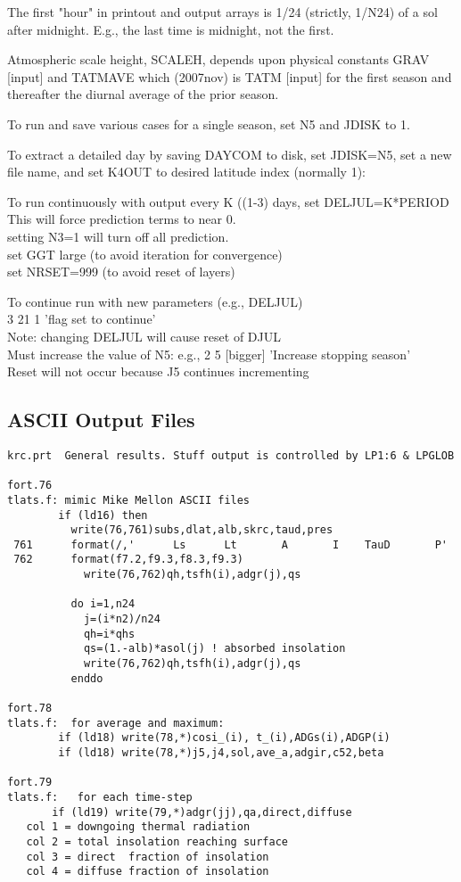 \documentclass[draft]{article}  %
\newcommand{\qi}{\\ \hspace*{2.em}}      %
\begin{document}
The first "hour" in printout and output arrays is 1/24 (strictly, 1/N24) of a
sol after midnight. E.g., the last time is midnight, not the first.

Atmospheric scale height, SCALEH, depends upon physical constants GRAV [input] 
and TATMAVE which (2007nov) is TATM [input] for the first season and 
thereafter the diurnal average of the prior season. 
 
To run and save various cases for a single season, set N5 and JDISK to 1.

To extract a detailed day by saving DAYCOM to disk, set JDISK=N5, set a new
file name, and set K4OUT to desired latitude index (normally 1):

To run continuously with output every K ((1-3) days, set DELJUL=K*PERIOD
This will force prediction terms to near 0.
\qi        setting N3=1 will turn off all prediction.
\qi        set GGT large (to avoid iteration for convergence)
\qi        set NRSET=999 (to avoid reset of layers)

To continue run with new parameters (e.g., DELJUL)
\qi	3 21 1 'flag set to continue' \\
Note: changing DELJUL will cause reset of DJUL \\
Must increase the value of N5: e.g., 2 5 [bigger] 'Increase stopping season' 
\qi Reset will not occur because J5 continues incrementing


\subsection{ASCII Output Files} %
\vspace{-3.mm}
\begin{verbatim}
krc.prt  General results. Stuff output is controlled by LP1:6 & LPGLOB

fort.76
tlats.f: mimic Mike Mellon ASCII files
        if (ld16) then
          write(76,761)subs,dlat,alb,skrc,taud,pres
 761      format(/,'      Ls      Lt       A       I    TauD       P'
 762      format(f7.2,f9.3,f8.3,f9.3)
            write(76,762)qh,tsfh(i),adgr(j),qs

          do i=1,n24
            j=(i*n2)/n24
            qh=i*qhs
            qs=(1.-alb)*asol(j) ! absorbed insolation
            write(76,762)qh,tsfh(i),adgr(j),qs
          enddo

fort.78
tlats.f:  for average and maximum:
        if (ld18) write(78,*)cosi_(i), t_(i),ADGs(i),ADGP(i)
        if (ld18) write(78,*)j5,j4,sol,ave_a,adgir,c52,beta

fort.79
tlats.f:   for each time-step
       if (ld19) write(79,*)adgr(jj),qa,direct,diffuse
   col 1 = downgoing thermal radiation
   col 2 = total insolation reaching surface
   col 3 = direct  fraction of insolation
   col 4 = diffuse fraction of insolation
\end{verbatim}
\end{document}
